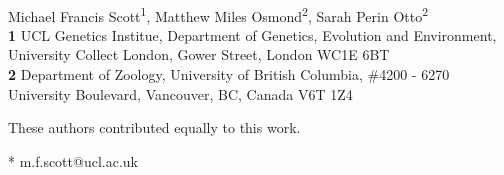 \documentclass[10pt,letterpaper]{article}
\date{}
\begin{document}
\vspace*{0.2in}

\begin{flushleft}
{\Large
\textbf{} %
}
\newline
\\
Michael Francis Scott\textsuperscript{1\Yinyang*},
Matthew Miles Osmond\textsuperscript{2\Yinyang},
Sarah Perin Otto\textsuperscript{2}
\\
\bigskip
\textbf{1} UCL Genetics Institue, Department of Genetics, Evolution and Environment, University Collect London, Gower Street, London WC1E 6BT 
\\
\textbf{2} Department of Zoology, University of British Columbia, \#4200 - 6270 University Boulevard, Vancouver, BC, Canada V6T 1Z4
\\
\bigskip

% 
%
\Yinyang These authors contributed equally to this work.





* m.f.scott@ucl.ac.uk

\end{flushleft}
\end{document}
